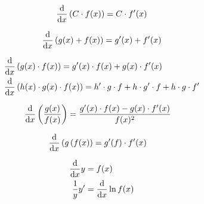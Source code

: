 \begin{boxleft}
\end{boxleft}\begin{boxrightshaded}
 \begin{align} 
\frac{\mathop{}\!\mathrm{d} }{\mathop{}\!\mathrm{d} x}\left(C\cdot f(x)\right)=C\cdot f'(x)
 \end{align}\end{boxrightshaded}

\begin{boxleft}
\end{boxleft}\begin{boxrightshaded}
 \begin{align} 
\frac{\mathop{}\!\mathrm{d} }{\mathop{}\!\mathrm{d} x}\left(g(x) + f(x)\right)=g'(x)+f'(x)
 \end{align}\end{boxrightshaded}

\begin{boxleft}
\end{boxleft}\begin{boxrightshaded}
 \begin{align} 
\frac{\mathop{}\!\mathrm{d} }{\mathop{}\!\mathrm{d} x}&\left(g(x)\cdot f(x)\right)=g'(x)\cdot f(x)+g(x)\cdot f'(x)\\
\frac{\mathop{}\!\mathrm{d} }{\mathop{}\!\mathrm{d} x}&\left(h(x)\cdot g(x)\cdot f(x)\right)=h'\cdot g\cdot f+h\cdot g'\cdot f+h\cdot g\cdot f'
 \end{align}\end{boxrightshaded}
            
\begin{boxleft}
\end{boxleft}\begin{boxrightshaded}
 \begin{align} 
\frac{\mathop{}\!\mathrm{d} }{\mathop{}\!\mathrm{d} x}\left(\frac{g(x)}{f(x)}\right)&=\frac{g'(x)\cdot f(x)-g(x)\cdot f'(x)}{f(x)^2}
 \end{align}\end{boxrightshaded}
            
\begin{boxleft}
\end{boxleft}\begin{boxrightshaded}
 \begin{align} 
\frac{\mathop{}\!\mathrm{d} }{\mathop{}\!\mathrm{d} x}\left(g\left( f(x\right)\right)&=g'(f)\cdot f'(x)
 \end{align}\end{boxrightshaded}
                 
\begin{boxleft}
\end{boxleft}\begin{boxrightshaded}
 \begin{align} 
\frac{\mathop{}\!\mathrm{d} }{\mathop{}\!\mathrm{d} x}y&=f(x)\\
\frac{1}{y}y'&=\frac{\mathop{}\!\mathrm{d} }{\mathop{}\!\mathrm{d} x}\ln{f(x)}
 \end{align}\end{boxrightshaded}
                   
